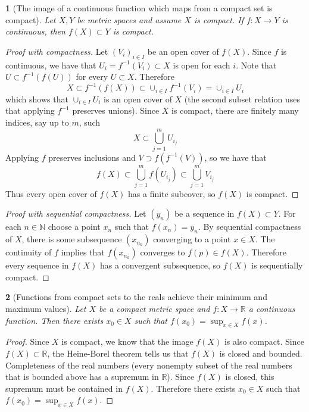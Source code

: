 \documentclass[12pt]{article}
\numberwithin{equation}{section}
\theoremstyle{plain}
\newtheorem{theorem}{\color{ForestGreen}{\textbf{Theorem}}}[section]
\theoremstyle{definition}
\newcommand\inv[1]{#1^{-1}}
\def\ss{\subset}
\newcommand{\1}{\mathbbm 1}
\newcommand{\RR}{\mathbb R}
\newcommand{\NN}{\mathbb N}
\begin{document}
\begin{theorem}[The image of a continuous function which maps from a compact set is compact]
	Let $X,Y$ be metric spaces and assume $X$ is compact. If $f: X \to Y$ is continuous, then $f(X) \subset Y$ is compact. 
\end{theorem}
\begin{proof}[Proof with compactness]
	Let $(V_i)_{i \in I}$ be an open cover of $f(X)$. Since $f$ is continuous, we have that $U_i = f^{-1}(V_i) \subset X$ is open for each $i$. Note that $U \ss \inv{f}(f(U))$ for every $U \subset X$. Therefore
	\begin{equation}
		X \ss \inv{f}(f(X)) \ss \cup_{i \in I} \inv{f}(V_{i}) = \cup_{i \in I} U_{i} 
	\end{equation}
	which shows that $\cup_{i \in I} U_{i}$ is an open cover of $X$ (the second subset relation uses that applying $f^{-1}$ preserves unions). Since $X$ is compact, there are finitely many indices, say up to $m$, such
	\begin{equation}
		X \ss \bigcup_{j=1}^m  U_{i_j}
	\end{equation}
	Applying $f$ preserves inclusions and $V \supset f(\inv{f}(V))$, so we have that
	\begin{equation}
		f(X) \ss \bigcup_{j=1}^m f(U_{i_j}) \ss \bigcup_{j=1}^m V_{i_j}
	\end{equation}
	Thus every open cover of $f(X)$ has a finite subcover, so $f(X)$ is compact. 
\end{proof}

\begin{proof}[Proof with sequential compactness]
	Let $(y_n)$ be a sequence in $f(X) \ss Y$. For each $n \in \NN$ choose a point $x_n$ such that $f(x_n) = y_n$. By sequential compactness of $X$, there is some subsequence $(x_{n_k})$ converging to a point $x \in X$. The continuity of $f$ implies that $f(x_{n_k})$ converges to $f(p) \in f(X)$. Therefore every sequence in $f(X)$ has a convergent subsequence, so $f(X)$ is sequentially compact.  
\end{proof}


\begin{theorem}[Functions from compact sets to the reals achieve their minimum and maximum values]
	Let $X$ be a compact metric space and $f:X \to \RR$ a continuous function. Then there exists $x_0 \in X$ such that $f(x_0) = \sup_{x\in X} f(x)$. 
\end{theorem}
\begin{proof}
	Since $X$ is compact, we know that the image $f(X)$ is also compact. Since $f(X) \ss \RR$, the Heine-Borel theorem tells us that $f(X)$ is closed and bounded. Completeness of the real numbers (every nonempty subset of the real numbers that is bounded above has a supremum in $\RR$). Since $f(X)$ is closed, this supremum must be contained in $f(X)$. Therefore there exists $x_0 \in X$ such that $f(x_0) = \sup_{x\in X} f(x)$. 
\end{proof}
\end{document}
